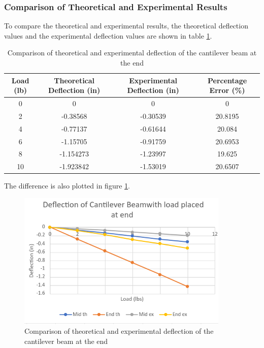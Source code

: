 \documentclass[12pt, titlepage]{article}
\begin{document}
\subsubsection{Comparison of Theoretical and Experimental Results}
To compare the theoretical and experimental results, the theoretical deflection
values and the experimental deflection values are shown in table \ref{tab:ComparisonCantileverBeamEnd}.
\begin{table}[H]
  \centering
  \caption{Comparison of theoretical and experimental deflection of the cantilever beam at the end}
  \label{tab:ComparisonCantileverBeamEnd}
  \begin{adjustwidth}{-1in}{-1in}
    \begin{tabular}{|c|c|c|c|}
        \hline
        \textbf{Load (lb)} & \textbf{Theoretical Deflection (in)} & \textbf{Experimental Deflection (in)} & \textbf{Percentage Error (\%)} \\
        \hline
        0 & 0 & 0 & 0 \\
        \hline
        2 & -0.38568 & -0.30539 & 20.8195 \\
        \hline
        4 & -0.77137 & -0.61644 & 20.084 \\
        \hline
        6 & -1.15705 & -0.91759 & 20.6953 \\
        \hline
        8 & -1.154273 & -1.23997 & 19.625 \\
        \hline
        10 & -1.923842 & -1.53019 & 20.6507 \\
        \hline
    \end{tabular}
  \end{adjustwidth}
\end{table}
\newpage
The difference is also plotted in figure \ref{fig:ComparisonCantileverBeamEnd}.
\begin{figure}[H]
    \centering
    \includegraphics[width=0.9\textwidth]{./Images/C_E_C.png}
    \caption{Comparison of theoretical and experimental deflection of the cantilever beam at the end}
    \label{fig:ComparisonCantileverBeamEnd}
\end{figure}
\newpage
\end{document}
